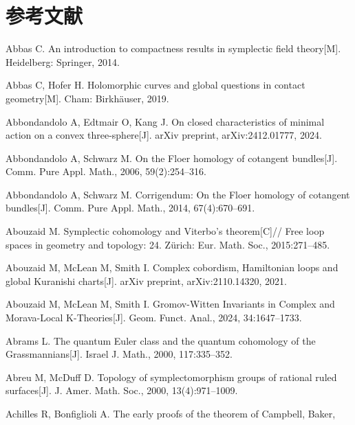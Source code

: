 \chapter*{参考文献}

\begingroup\sloppy
\begin{enumerate}[label={[\arabic*]},leftmargin=3.2em,itemsep=2pt,parsep=0pt]
  \item Abbas C. An introduction to compactness results in symplectic field theory[M].
        Heidelberg: Springer, 2014.
  \item Abbas C, Hofer H. Holomorphic curves and global questions in contact geometry[M].
        Cham: Birkhäuser, 2019.
  \item Abbondandolo A, Edtmair O, Kang J. On closed characteristics of minimal action on a
        convex three-sphere[J]. arXiv preprint, arXiv:2412.01777, 2024.
  \item Abbondandolo A, Schwarz M. On the Floer homology of cotangent bundles[J].
        Comm. Pure Appl. Math., 2006, 59(2):254--316.
  \item Abbondandolo A, Schwarz M. Corrigendum: On the Floer homology of cotangent
        bundles[J]. Comm. Pure Appl. Math., 2014, 67(4):670--691.
  \item Abouzaid M. Symplectic cohomology and Viterbo's theorem[C]// Free loop spaces in
        geometry and topology: 24. Zürich: Eur. Math. Soc., 2015:271--485.
  \item Abouzaid M, McLean M, Smith I. Complex cobordism, Hamiltonian loops and global
        Kuranishi charts[J]. arXiv preprint, arXiv:2110.14320, 2021.
  \item Abouzaid M, McLean M, Smith I. Gromov-Witten Invariants in Complex and
        Morava-Local K-Theories[J]. Geom. Funct. Anal., 2024, 34:1647--1733.
  \item Abrams L. The quantum Euler class and the quantum cohomology of the
        Grassmannians[J]. Israel J. Math., 2000, 117:335--352.
  \item Abreu M, McDuff D. Topology of symplectomorphism groups of rational ruled
        surfaces[J]. J. Amer. Math. Soc., 2000, 13(4):971--1009.
  \item Achilles R, Bonfiglioli A. The early proofs of the theorem of Campbell, Baker,

\end{enumerate}
